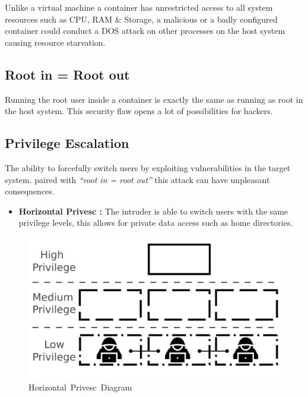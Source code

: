 \documentclass[
  14pt,
  english,
  a4paper,
]{scrreprt}
\providecommand{\tightlist}{%
  \setlength{\itemsep}{0pt}\setlength{\parskip}{0pt}}
\begin{document}
Unlike a virtual machine a container has unrestricted access to all
system resources such as CPU, RAM \& Storage, a malicious or a badly
configured container could conduct a DOS attack on other processes on
the host system causing resource starvation.

\hypertarget{root-in-root-out}{%
\subsection{Root in = Root out}\label{root-in-root-out}}

Running the root user inside a container is exactly the same as running
as root in the host system. This security flaw opens a lot of
possibilities for hackers.

\hypertarget{privilege-escalation}{%
\subsection{Privilege Escalation}\label{privilege-escalation}}

The ability to forcefully switch users by exploiting vulnerabilities in
the target system. paired with \emph{``root in = root out''} this attack
can have unpleasant consequences.

\begin{itemize}
\tightlist
\item
  \textbf{Horizontal Privesc :} The intruder is able to switch users
  with the same privilege levels, this allows for private data access
  such as home directories.
\end{itemize}

\begin{figure}
\hypertarget{fig:hpresc}{%
\centering
\includegraphics[width=1\textwidth,height=\textheight]{figures/horiz_presc_diagram.png}
\caption{Horizontal~Privesc~Diagram}\label{fig:hpresc}
}
\end{figure}
\end{document}
